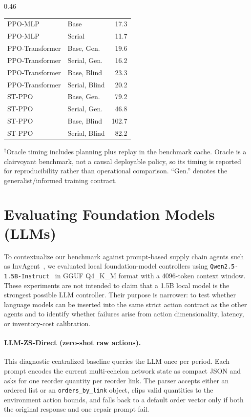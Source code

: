 \documentclass[10pt,a4paper]{article}
\begin{document}
\begin{table}[!tbp]
\begin{subtable}[t]{0.46\textwidth}
\begin{tabular}{@{} l l r @{}}
\midrule
PPO-MLP  & Base           &  17.3 \\
PPO-MLP  & Serial         &  11.7 \\
\rowcolor{lightgray}
PPO-Transformer & Base, Gen.     &  19.6 \\
PPO-Transformer & Serial, Gen.   &  16.2 \\
PPO-Transformer & Base, Blind    &  23.3 \\
PPO-Transformer & Serial, Blind  &  20.2 \\
\rowcolor{lightgray}
ST-PPO    & Base, Gen.     &  79.2 \\
ST-PPO    & Serial, Gen.   &  46.8 \\
ST-PPO    & Base, Blind    & 102.7 \\
ST-PPO    & Serial, Blind  &  82.2 \\
\bottomrule
\end{tabular}
\end{subtable}

\vspace{1mm}
\footnotesize{$^{\dagger}$Oracle timing includes planning plus replay in the benchmark cache. Oracle is a clairvoyant benchmark, not a causal deployable policy, so its timing is reported for reproducibility rather than operational comparison. ``Gen.'' denotes the generalist/informed training contract.}
\end{table}

\section{Evaluating Foundation Models (LLMs)}\label{sec:appendix_llm}

To contextualize our benchmark against prompt-based supply chain agents
such as InvAgent~\citep{quan2024}, we evaluated local foundation-model
controllers using \texttt{Qwen2.5-1.5B-Instruct}~\citep{qwen2024} in GGUF
Q4\_K\_M format with a 4096-token context window. These experiments are
not intended to claim that a 1.5B local model is the strongest possible
LLM controller. Their purpose is narrower: to test whether language
models can be inserted into the same strict action contract as the
other agents and to identify whether failures arise from action
dimensionality, latency, or inventory-cost calibration.

\paragraph{LLM-ZS-Direct (zero-shot raw actions).}
This diagnostic centralized baseline queries the LLM once per period.
Each prompt encodes the current multi-echelon network state as compact
JSON and asks for one reorder quantity per reorder link. The parser
accepts either an ordered list or an \texttt{orders\_by\_link} object,
clips valid quantities to the environment action bounds, and falls back
to a default order vector only if both the original response and one
repair prompt fail.
\end{document}
